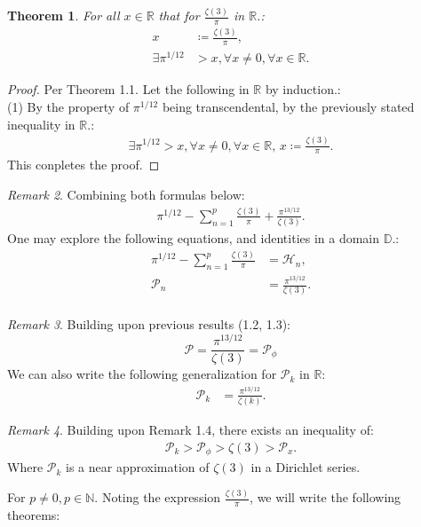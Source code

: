 \documentclass[10pt]{article}
\theoremstyle{plain}
\newtheorem{theorem}{Theorem}[section]
\theoremstyle{definition}
\theoremstyle{remark}
\newtheorem{remark}[theorem]{Remark}
\begin{document}
\begin{theorem}
For all $x \in \mathbb{R}$ that for $\frac{\zeta(3)}{\pi}$ in $\mathbb{R}$.:
\begin{align*}
	x &\coloneq \frac{\zeta(3)}{\pi},\\
	\exists \pi^{1/12} &> x, \forall x \neq 0, \forall x \in \mathbb{R}.
\end{align*}
\end{theorem}
\begin{proof}
Per Theorem 1.1. Let the following in $\mathbb{R}$ by induction.:\\(1) By the property of $\pi^{1/12}$ being transcendental, by the previously stated inequality in $\mathbb{R}.$:
\begin{align*}
		\exists \pi^{1/12} > x, \forall x \neq 0, \forall x \in \mathbb{R}, \, x \coloneq \frac{\zeta(3)}{\pi}.
\end{align*}
This conpletes the proof.
\end{proof}
\begin{remark}
	Combining both formulas below:
	\begin{align*}
		\pi^{1/12} - \sum_{n=1}^{p}\frac{\zeta(3)}{\pi} + \frac{\pi^{13/12}}{\zeta(3)}.
	\end{align*}
	One may explore the following equations, and identities in a domain $\mathbb{D}.$:
	\begin{align*}
		\pi^{1/12} - \sum_{n=1}^{p}\frac{\zeta(3)}{\pi} &= \mathcal{H}_n,\\
		\mathcal{P}_n &= \frac{\pi^{13/12}}{\zeta(3)}.\\
	\end{align*}
\end{remark}
\begin{remark}
	Building upon previous results (1.2, 1.3):
	\begin{equation}
		\mathcal{P} = \frac{\pi^{13/12}}{\zeta(3)} = \mathcal{P}_\phi
	\end{equation}
	We can also write the following generalization for $\mathcal{P}_k$ in $\mathbb{R}$:
	\begin{align*}
		\mathcal{P}_k &= \frac{\pi^{13/12}}{\zeta(k)}.
	\end{align*}
\end{remark}
\begin{remark}
	Building upon Remark 1.4, there exists an inequality of:
	\begin{align*}
		\mathcal{P}_k > \mathcal{P}_\phi > \zeta(3) > \mathcal{P}_x. 
	\end{align*}
	Where $\mathcal{P}_k$ is a near approximation of $\zeta(3)$ in a Dirichlet series.
\end{remark} For $p \neq 0, p \in \mathbb{N}$. Noting the expression $\frac{\zeta(3)}{\pi}$, we will write the following theorems:
\end{document}
